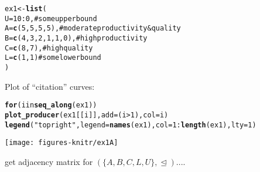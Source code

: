 \documentclass[11pt]{article}\usepackage{graphicx, color}
\makeatletter
\newcommand{\hlfunctioncall}[1]{\textcolor[rgb]{0.501960784313725,0,0.329411764705882}{\textbf{#1}}}%
\newcommand{\hlstring}[1]{\textcolor[rgb]{0.6,0.6,1}{#1}}%
\newcommand{\hlcomment}[1]{\textcolor[rgb]{0.180392156862745,0.6,0.341176470588235}{#1}}%
\newenvironment{kframe}{%
 \def\at@end@of@kframe{}%
 \ifinner\ifhmode%
  \def\at@end@of@kframe{\end{minipage}}%
  \begin{minipage}{\columnwidth}%
 \fi\fi%
 \def\FrameCommand##1{\hskip\@totalleftmargin \hskip-\fboxsep
 \colorbox{shadecolor}{##1}\hskip-\fboxsep
     \hskip-\linewidth \hskip-\@totalleftmargin \hskip\columnwidth}%
 \MakeFramed {\advance\hsize-\width
   \@totalleftmargin\z@ \linewidth\hsize
   \@setminipage}}%
 {\par\unskip\endMakeFramed%
 \at@end@of@kframe}
\newenvironment{knitrout}{}{} %
\theoremstyle{remark}
\theoremstyle{definition}
\makeatother
\begin{document}
\begin{knitrout}\small
{}\color{fgcolor}\begin{kframe}
\begin{alltt}
ex1 <- \hlfunctioncall{list}(
   U = 10:0,           \hlcomment{# some upper bound}
   A = \hlfunctioncall{c}(5,5,5,5),     \hlcomment{# moderate productivity & quality}
   B = \hlfunctioncall{c}(4,3,2,1,1,0), \hlcomment{# high productivity}
   C = \hlfunctioncall{c}(8,7),         \hlcomment{# high quality}
   L = \hlfunctioncall{c}(1,1)          \hlcomment{# some lower bound}
)
\end{alltt}
\end{kframe}
\end{knitrout}


Plot of ``citation'' curves:

\begin{knitrout}\small
{}\color{fgcolor}\begin{kframe}
\begin{alltt}
\hlfunctioncall{for} (i in \hlfunctioncall{seq_along}(ex1))
\hlfunctioncall{plot_producer}(ex1[[i]], add=(i>1), col=i)
\hlfunctioncall{legend}(\hlstring{"topright"}, legend=\hlfunctioncall{names}(ex1), col=1:\hlfunctioncall{length}(ex1), lty=1)
\end{alltt}
\end{kframe}

{\centering \texttt{[image: figures-knitr/ex1A]} 

}



\end{knitrout}


get adjacency matrix for $(\{A, B, C, L, U\}, \trianglelefteq)$....
\end{document}
